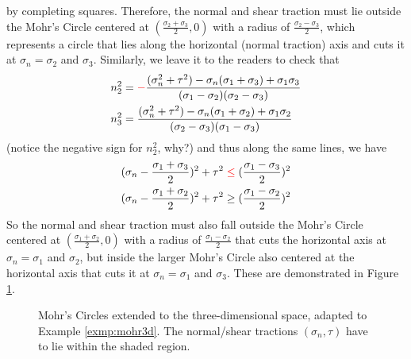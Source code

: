 by completing squares. Therefore, the normal and shear traction must lie outside the Mohr's Circle centered at $(\frac{\sigma_2 + \sigma_3}{2},0)$ with a radius of $\frac{\sigma_2 - \sigma_3}{2}$, which represents a circle that lies along the horizontal (normal traction) axis and cuts it at $\sigma_n = \sigma_2$ and $\sigma_3$. Similarly, we leave it to the readers to check that
\begin{align}
n_2^2 &= \mathcolor{red}{-}\frac{(\sigma_n^2 + \tau^2) - \sigma_n(\sigma_1 + \sigma_3) + \sigma_1\sigma_3}{(\sigma_1 - \sigma_2)(\sigma_2-\sigma_3)} \\
n_3^2 &= \frac{(\sigma_n^2 + \tau^2) - \sigma_n(\sigma_1 + \sigma_2) + \sigma_1\sigma_2}{(\sigma_2 - \sigma_3)(\sigma_1-\sigma_3)}
\end{align}
(notice the negative sign for $n_2^2$, why?) and thus along the same lines, we have
\begin{align}
(\sigma_n-\frac{\sigma_1 + \sigma_3}{2})^2 + \tau^2 &\mathcolor{red}{\leq} (\frac{\sigma_1 - \sigma_3}{2})^2 \\
(\sigma_n-\frac{\sigma_1 + \sigma_2}{2})^2 + \tau^2 &\geq (\frac{\sigma_1 - \sigma_2}{2})^2
\end{align}
So the normal and shear traction must also fall outside the Mohr's Circle centered at $(\frac{\sigma_1 + \sigma_2}{2},0)$ with a radius of $\frac{\sigma_1 - \sigma_2}{2}$ that cuts the horizontal axis at $\sigma_n = \sigma_1$ and $\sigma_2$, but inside the larger Mohr's Circle also centered at the horizontal axis that cuts it at $\sigma_n = \sigma_1$ and $\sigma_3$. These are demonstrated in Figure \ref{fig:mohr3d}.

\begin{figure}
    \centering
    \caption{Mohr's Circles extended to the three-dimensional space, adapted to Example \ref{exmp:mohr3d}. The normal/shear tractions $(\sigma_n, \tau)$ have to lie within the shaded region.}
    \label{fig:mohr3d}
\end{figure}


